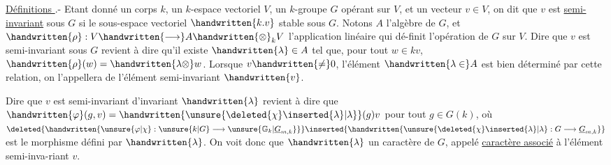 \uline{Définitions }.- Etant donné un corps $k$, un $k$-espace vectoriel $V$, un $k$-groupe $G$ opérant sur $V$, et un vecteur $v\in V$, on dit que $v$ est \uline{semi-invariant} sous $G$ si le sous-espace vectoriel $\handwritten{k.v}$  stable sous $G$.
Notons $A$ l'algèbre de $G$, et $\handwritten{\rho}:V\handwritten{\longrightarrow}A\handwritten{\otimes}_k V$ l'application linéaire qui dé-\linebreak finit l'opération de $G$ sur $V$. Dire que $v$ est semi-invariant sous $G$ revient à dire  qu'il existe $\handwritten{\lambda}\in A$ tel que, pour tout $w\in kv$, $\handwritten{\rho}(w)=\handwritten{\lambda\otimes}w$. Lorsque $v\handwritten{\neq}0$, l'élément $\handwritten{\lambda\in}A$ est bien déterminé par cette relation, on l'appellera  de l'élément semi-invariant $\handwritten{v}$.

 Dire que $v$ est semi-invariant  d'invariant $\handwritten{\lambda}$ revient à dire que $\handwritten{\varphi}(g,v)=\handwritten{\unsure{\deleted{\chi}\inserted{\lambda}|\lambda}}(g)v$ pour tout $g\in G(k)$, où $\deleted{\handwritten{\unsure{\varphi|\chi}:\unsure{k|G}\longrightarrow\unsure{\mathbb{G}_k|\underline{G}_{m,k}}}}\inserted{\handwritten{\unsure{\deleted{\chi}\inserted{\lambda}|\lambda}:G\longrightarrow\underline{G}_{m,k}}}$ est le morphisme défini par $\handwritten{\lambda}$. On voit donc que $\handwritten{\lambda}$  un caractère \deleted{\handwritten{$\unsure{\chi|\lambda}$}} de $G$, appelé \uline{caractère associé} à l'élément semi-inva-\linebreak riant $v$. 
\margin{\handwritten{!}}
